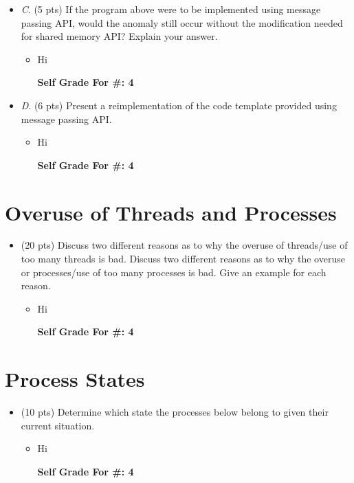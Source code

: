 \documentclass[conference]{IEEEtran}
\begin{document}
\begin{itemize}
	\item \textit{C}. (5 pts) If the program above were to be implemented using message passing API, would the
	anomaly still occur without the modification needed for shared memory API? Explain your
	answer.
	\begin{itemize} 
	\item Hi
		\begin{center}
			\textbf{Self Grade For \#: 4}
		\end{center}
	\end{itemize}
\end{itemize}

\begin{itemize}
\item \textit{D}. (6 pts) Present a reimplementation of the code template provided using message passing
API.
	\begin{itemize} 
	\item Hi
		\begin{center}
			\textbf{Self Grade For \#: 4}
		\end{center}
	\end{itemize}
\end{itemize}

\section{Overuse of Threads and Processes}
\begin{itemize}
	\item (20 pts) Discuss two different reasons as to why the overuse
	of threads/use of too many threads is bad. Discuss two different reasons as to why the overuse
	or processes/use of too many processes is bad. Give an example for each reason.
	\begin{itemize} 
		\item Hi
		\begin{center}
			\textbf{Self Grade For \#: 4}
		\end{center}
	\end{itemize}
\end{itemize}


\section{Process States}
\begin{itemize}
	\item (10 pts) Determine which state the processes below belong to given their current
	situation.
	\begin{itemize} 
		\item Hi
		\begin{center}
			\textbf{Self Grade For \#: 4}
		\end{center}
	\end{itemize}
\end{itemize}

\printbibliography
\end{document}
